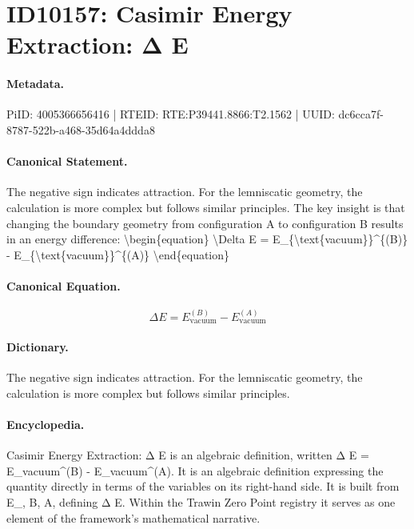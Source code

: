 \section*{ID10157: Casimir Energy Extraction: Δ E}
\paragraph{Metadata.}
PiID: 4005366656416 | RTEID: RTE:P39441.8866:T2.1562 | UUID: dc6cca7f-8787-522b-a468-35d64a4ddda8

\paragraph{Canonical Statement.}
The negative sign indicates attraction. For the lemniscatic geometry, the calculation is more complex but follows similar principles. The key insight is that changing the boundary geometry from configuration A to configuration B results in an energy difference: \textbackslash{}begin\{equation\} \textbackslash{}Delta E = E\_\{\textbackslash{}text\{vacuum\}\}\textasciicircum{}\{(B)\} - E\_\{\textbackslash{}text\{vacuum\}\}\textasciicircum{}\{(A)\} \textbackslash{}end\{equation\}

\paragraph{Canonical Equation.}
\[
\Delta E = E_{\text{vacuum}}^{(B)} - E_{\text{vacuum}}^{(A)}
\]

\paragraph{Dictionary.}
The negative sign indicates attraction. For the lemniscatic geometry, the calculation is more complex but follows similar principles.

\paragraph{Encyclopedia.}
Casimir Energy Extraction: Δ E is an algebraic definition, written Δ E = E\_vacuum\textasciicircum{}(B) - E\_vacuum\textasciicircum{}(A). It is an algebraic definition expressing the quantity directly in terms of the variables on its right-hand side. It is built from E\_, B, A, defining Δ E. Within the Trawin Zero Point registry it serves as one element of the framework's mathematical narrative.
